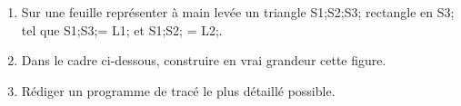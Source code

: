 \documentclass[exercice]{thedocument}%
\begin{document}
%
\begin{enumerate}
    \item Sur une feuille représenter à main levée un triangle
    {\<S1;\<S2;\<S3;} rectangle en {\<S3;} tel que {\<S1;\<S3;}=
    {\<L1;} et {\<S1;\<S2;} = \<L2;.
    \item Dans le cadre ci-dessous, construire en vrai grandeur cette figure.
    \item Rédiger un programme de tracé le plus détaillé possible.
\end{enumerate}
\begin{mdframed}
    \vspace{8cm}
\end{mdframed}
\end{document}
